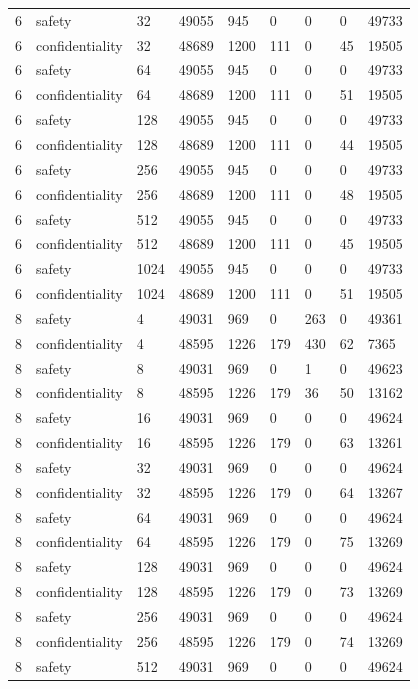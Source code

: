 \documentclass[10pt]{article}
\begin{document}
\begin{landscape}
\begin{longtable}{lllllllll}
6 & safety & 32 & 49055 & 945 & 0 & 0 & 0 & 49733\\
6 & confidentiality & 32 & 48689 & 1200 & 111 & 0 & 45 & 19505\\
6 & safety & 64 & 49055 & 945 & 0 & 0 & 0 & 49733\\
6 & confidentiality & 64 & 48689 & 1200 & 111 & 0 & 51 & 19505\\
6 & safety & 128 & 49055 & 945 & 0 & 0 & 0 & 49733\\
6 & confidentiality & 128 & 48689 & 1200 & 111 & 0 & 44 & 19505\\
6 & safety & 256 & 49055 & 945 & 0 & 0 & 0 & 49733\\
6 & confidentiality & 256 & 48689 & 1200 & 111 & 0 & 48 & 19505\\
6 & safety & 512 & 49055 & 945 & 0 & 0 & 0 & 49733\\
6 & confidentiality & 512 & 48689 & 1200 & 111 & 0 & 45 & 19505\\
6 & safety & 1024 & 49055 & 945 & 0 & 0 & 0 & 49733\\
6 & confidentiality & 1024 & 48689 & 1200 & 111 & 0 & 51 & 19505\\
8 & safety & 4 & 49031 & 969 & 0 & 263 & 0 & 49361\\
8 & confidentiality & 4 & 48595 & 1226 & 179 & 430 & 62 & 7365\\
8 & safety & 8 & 49031 & 969 & 0 & 1 & 0 & 49623\\
8 & confidentiality & 8 & 48595 & 1226 & 179 & 36 & 50 & 13162\\
8 & safety & 16 & 49031 & 969 & 0 & 0 & 0 & 49624\\
8 & confidentiality & 16 & 48595 & 1226 & 179 & 0 & 63 & 13261\\
8 & safety & 32 & 49031 & 969 & 0 & 0 & 0 & 49624\\
8 & confidentiality & 32 & 48595 & 1226 & 179 & 0 & 64 & 13267\\
8 & safety & 64 & 49031 & 969 & 0 & 0 & 0 & 49624\\
8 & confidentiality & 64 & 48595 & 1226 & 179 & 0 & 75 & 13269\\
8 & safety & 128 & 49031 & 969 & 0 & 0 & 0 & 49624\\
8 & confidentiality & 128 & 48595 & 1226 & 179 & 0 & 73 & 13269\\
8 & safety & 256 & 49031 & 969 & 0 & 0 & 0 & 49624\\
8 & confidentiality & 256 & 48595 & 1226 & 179 & 0 & 74 & 13269\\
8 & safety & 512 & 49031 & 969 & 0 & 0 & 0 & 49624\\

\end{longtable}
\end{landscape}
\end{document}
